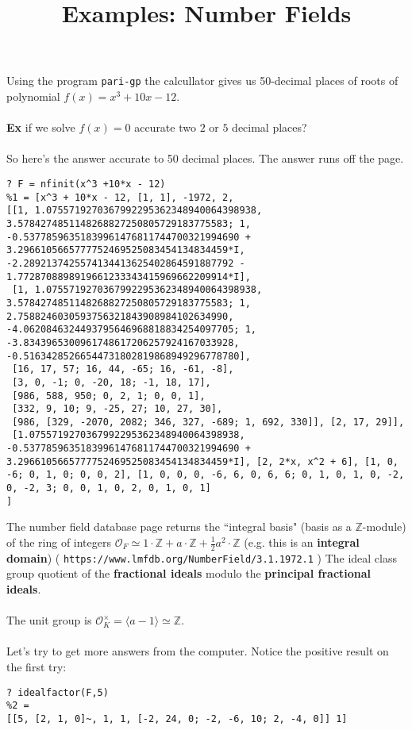\documentclass[12pt]{article}
\title{Examples: Number Fields}
\date{}
\begin{document}
\sffamily

\maketitle

{\fontsize{16pt}{16pt}\selectfont 

\noindent Using the program \texttt{pari-gp}  the calcullator gives us 50-decimal places of roots of polynomial $f(x) = x^3 + 10x - 12$. \\ \\
\textbf{Ex} if we solve $f(x) = 0$ accurate two $2$ or $5$ decimal places? \\ \\
So here's the answer accurate to 50 decimal places.  The answer runs off the page.

\begin{verbatim}
? F = nfinit(x^3 +10*x - 12)
%1 = [x^3 + 10*x - 12, [1, 1], -1972, 2, 
[[1, 1.0755719270367992295362348940064398938, 3.5784274851148268827250805729183775583; 1, -0.53778596351839961476811744700321994690 + 3.2966105665777752469525083454134834459*I, -2.2892137425574134413625402864591887792 - 1.7728708898919661233343415969662209914*I], 
 [1, 1.0755719270367992295362348940064398938, 3.5784274851148268827250805729183775583; 1, 2.7588246030593756321843908984102634990, -4.0620846324493795646968818834254097705; 1, -3.8343965300961748617206257924167033928, -0.51634285266544731802819868949296778780], 
 [16, 17, 57; 16, 44, -65; 16, -61, -8], 
 [3, 0, -1; 0, -20, 18; -1, 18, 17], 
 [986, 588, 950; 0, 2, 1; 0, 0, 1], 
 [332, 9, 10; 9, -25, 27; 10, 27, 30], 
 [986, [329, -2070, 2082; 346, 327, -689; 1, 692, 330]], [2, 17, 29]],
 [1.0755719270367992295362348940064398938, -0.53778596351839961476811744700321994690 + 3.2966105665777752469525083454134834459*I], [2, 2*x, x^2 + 6], [1, 0, -6; 0, 1, 0; 0, 0, 2], [1, 0, 0, 0, -6, 6, 0, 6, 6; 0, 1, 0, 1, 0, -2, 0, -2, 3; 0, 0, 1, 0, 2, 0, 1, 0, 1]
]

\end{verbatim}
The number field database page returns the ``integral basis" (basis as a $\mathbb{Z}$-module) of the ring of integers $\mathcal{O}_F \simeq 1 \cdot \mathbb{Z} + a \cdot \mathbb{Z} + \frac{1}{2}a^2 \cdot \mathbb{Z}$ (e.g. this is an \textbf{integral domain}) ( \texttt{https://www.lmfdb.org/NumberField/3.1.1972.1} ) The ideal class group quotient of the \textbf{fractional ideals}  modulo the \textbf{principal fractional ideals}.  \\ \\
The unit group is $\mathcal{O}_K^\times = \langle a - 1 \rangle \simeq \mathbb{Z}$.  \\ \\
Let's try to get more answers from the computer. Notice the positive result on the first try:\\
\begin{verbatim}
? idealfactor(F,5)
%2 = 
[[5, [2, 1, 0]~, 1, 1, [-2, 24, 0; -2, -6, 10; 2, -4, 0]] 1]


\end{verbatim}}
\end{document}
